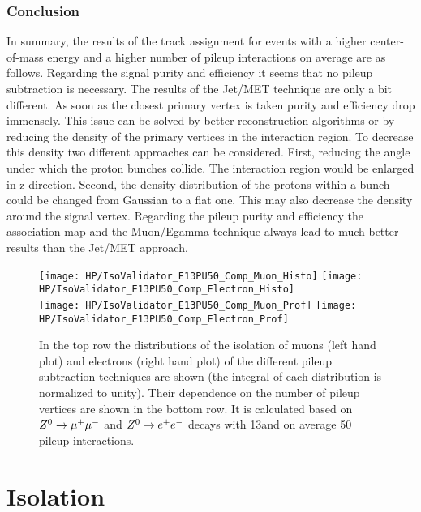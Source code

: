 \subsubsection{Conclusion}

In summary, the results of the track assignment for events with a higher center-of-mass energy and a higher number of pileup interactions on average are as follows. Regarding the signal purity and efficiency it seems that no pileup subtraction is necessary. The results of the Jet/MET technique are only a bit different. As soon as the closest primary vertex is taken purity and efficiency drop immensely. This issue can be solved by better reconstruction algorithms or by reducing the density of the primary vertices in the interaction region. To decrease this density two different approaches can be considered. First, reducing the angle under which the proton bunches collide. The interaction region would be enlarged in z direction. Second, the density distribution of the protons within a bunch could be changed from Gaussian to a flat one. This may also decrease the density around the signal vertex. Regarding the pileup purity and efficiency the association map and the Muon/Egamma technique always lead to much better results than the Jet/MET approach.

\begin{figure}[Hb]
    \centering
    \texttt{[image: HP/IsoValidator\_E13PU50\_Comp\_Muon\_Histo]}
    \texttt{[image: HP/IsoValidator\_E13PU50\_Comp\_Electron\_Histo]}
    \\
    \texttt{[image: HP/IsoValidator\_E13PU50\_Comp\_Muon\_Prof]}
    \texttt{[image: HP/IsoValidator\_E13PU50\_Comp\_Electron\_Prof]}
    \caption[Distribution of the isolation of muons and electrons and their dependence on the number of pileup vertices for events with 13\TeV and $\left<PU\right>=50$]{In the top row the distributions of the isolation of muons (left hand plot) and electrons (right hand plot) of the different pileup subtraction techniques are shown (the integral of each distribution is normalized to unity). Their dependence on the number of pileup vertices are shown in the bottom row. It is calculated based on ${Z^{0}}\rightarrow\mu^+\mu^-$ and ${Z^{0}}\rightarrow e^+e^-$ decays with 13\TeV and on average 50 pileup interactions.\label{plot:HPUIsoE13PU50}}
\end{figure}

\section{Isolation \label{sec:HPUIso}}

